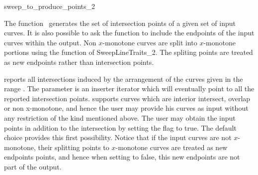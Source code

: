 

\begin{ccRefFunction}{sweep_to_produce_points_2}  %


\ccDefinition
  
The function \ccRefName\ generates the set of intersection points of a
given set of input curves. It is also possible to ask the function to
include the endpoints of the input curves within the output.
Non $x$-monotone curves are split into $x$-monotone portions using the  
function of SweepLineTraits_2. The spliting points are treated as new endpoints rather than 
intersection points.


   {reports all intersections induced by the arrangement of the curves
   given in the range \ccStyle{[curves_begin, curves_end)}. The
   parameter  is an inserter iterator which 
   will eventually point to all the reported intersection points. 
    supports
   curves which are interior intersect, overlap or non x-monotone, and
   hence the user may provide his curves as input without any
   restriction of the kind mentioned above. 
   The user may obtain the input points in addition to the intersection 
   by setting the flag  to true. 
   The default choice provides this first possibility. 
   Notice that if the input curves are not $x$-monotone, their splitting points 
   to $x$-monotone curves are treated as new endpoints points, and hence 
   when setting  to false, this new endpoints are not part 
   of the output.}


\end{ccRefFunction}
